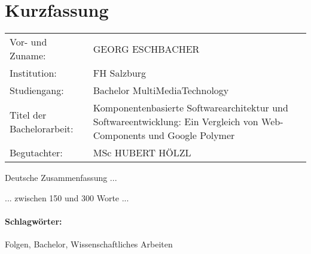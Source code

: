 \section*{Kurzfassung}
\begin{tabular}{l l}
Vor- und Zuname:& GEORG ESCHBACHER\\
Institution: & FH Salzburg\\
Studiengang: &  Bachelor MultiMediaTechnology\\
Titel der Bachelorarbeit: & Komponentenbasierte Softwarearchitektur und Softwareentwicklung: Ein Vergleich von Web-Components und Google Polymer\\
Begutachter: & MSc HUBERT HÖLZL\\
\end{tabular}
\vspace{0.5cm}

Deutsche Zusammenfassung ...

... zwischen 150 und 300 Worte ...

\paragraph{Schlagwörter:}
Folgen, Bachelor, Wissenschaftliches Arbeiten

